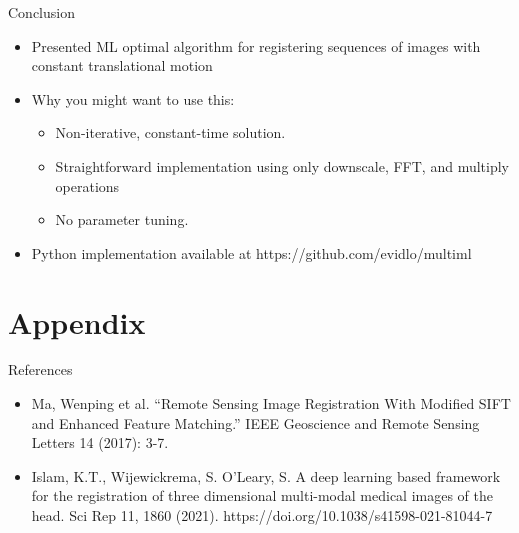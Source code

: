 \documentclass[10pt,xcolor=dvipsnames]{beamer}
\begin{document}


\begin{frame}{Conclusion}
  \begin{itemize}
    \item Presented ML optimal algorithm for registering sequences of images with constant translational motion
    \item Why you might want to use this:
    \begin{itemize}
      \item Non-iterative, constant-time solution.
      \item Straightforward implementation using only downscale, FFT, and multiply operations
      \item No parameter tuning.
    \end{itemize}

  \item Python implementation available at https://github.com/evidlo/multiml
  \end{itemize}

\end{frame}


\section*{Appendix}

\begin{frame}{References}
  \begin{itemize}
    \item Ma, Wenping et al. “Remote Sensing Image Registration With Modified SIFT and Enhanced Feature Matching.” IEEE Geoscience and Remote Sensing Letters 14 (2017): 3-7.
    \item Islam, K.T., Wijewickrema, S. O’Leary, S. A deep learning based framework for the registration of three dimensional multi-modal medical images of the head. Sci Rep 11, 1860 (2021). https://doi.org/10.1038/s41598-021-81044-7
  \end{itemize}
\end{frame}
\end{document}
